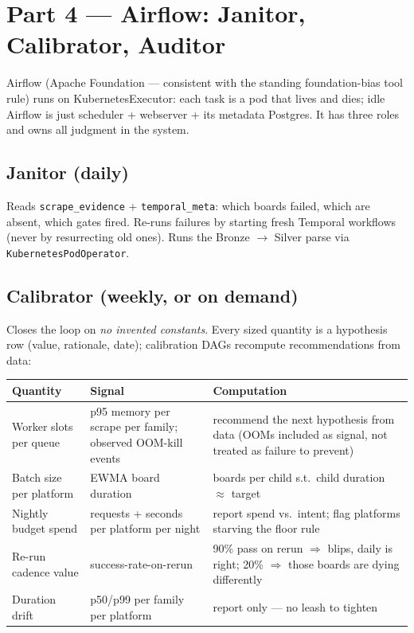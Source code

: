 \documentclass[11pt,a4paper]{article}
\begin{document}
\section{Part 4 --- Airflow: Janitor, Calibrator, Auditor}
\label{sec:airflow}

Airflow (Apache Foundation --- consistent with the standing foundation-bias tool rule) runs on
KubernetesExecutor: each task is a pod that lives and dies; idle Airflow is just scheduler + webserver +
its metadata Postgres. It has three roles and owns all judgment in the system.

\subsection{Janitor (daily)}
Reads \texttt{scrape\_evidence} + \texttt{temporal\_meta}: which boards failed, which are absent, which
gates fired. Re-runs failures by starting fresh Temporal workflows (never by resurrecting old ones). Runs
the Bronze $\rightarrow$ Silver parse via \texttt{KubernetesPodOperator}.

\subsection{Calibrator (weekly, or on demand)}
\label{sec:calibration}
Closes the loop on \emph{no invented constants}. Every sized quantity is a hypothesis row (value,
rationale, date); calibration DAGs recompute recommendations from data:

\begin{center}
\begin{tabularx}{\textwidth}{@{}lXX@{}}
\toprule
Quantity & Signal & Computation \\
\midrule
Worker slots per queue & p95 memory per scrape per family; observed OOM-kill events & recommend the next
hypothesis from data (OOMs included as signal, not treated as failure to prevent) \\
Batch size per platform & EWMA board duration & boards per child s.t.\ child duration
$\approx$ target \\
Nightly budget spend & requests + seconds per platform per night & report spend vs.\ intent; flag
platforms starving the floor rule \\
Re-run cadence value & success-rate-on-rerun & 90\% pass on rerun $\Rightarrow$ blips, daily is right;
20\% $\Rightarrow$ those boards are dying differently \\
Duration drift & p50/p99 per family per platform & report only --- no leash to tighten \\
\bottomrule
\end{tabularx}
\end{center}
\end{document}

